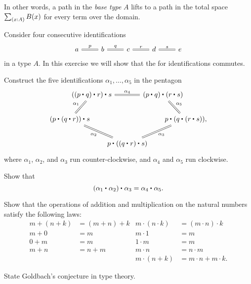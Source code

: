 \begin{exercises}
\begin{equation*}
\end{equation*}
In other words, a path in the \emph{base type} $A$ lifts to a path in the total space $\sm{x:A}B(x)$ for every term over the domain.
\item Consider four consecutive identifications
\begin{equation*}
\begin{tikzcd}
a \arrow[r,equals,"p"] & b \arrow[r,equals,"q"] & c \arrow[r,equals,"r"] & d \arrow[r,equals,"s"] & e
\end{tikzcd}
\end{equation*}
in a type $A$. In this exercise we will show that the  for identifications commutes.
\begin{subexenum}
\item Construct the five identifications $\alpha_1,\ldots,\alpha_5$ in the pentagon
\begin{equation*}
\begin{tikzcd}[column sep=-1.5em]
&[-2em] \ct{(\ct{(\ct{p}{q})}{r})}{s} \arrow[rr,equals,"\alpha_4"] \arrow[dl,equals,swap,"\alpha_1"] & & \ct{(\ct{p}{q})}{(\ct{r}{s})} \arrow[dr,equals,"\alpha_5"] &[-2em] \\
\ct{(\ct{p}{(\ct{q}{r})})}{s} \arrow[drr,equals,swap,"\alpha_2"] & & & & \ct{p}{(\ct{q}{(\ct{r}{s})})}, \\
& & \ct{p}{(\ct{(\ct{q}{r})}{s})} \arrow[urr,equals,swap,"\alpha_3"]
\end{tikzcd}
\end{equation*}
where $\alpha_1$, $\alpha_2$, and $\alpha_3$ run counter-clockwise, and $\alpha_4$ and $\alpha_5$ run clockwise.
\item Show that
\begin{equation*}
\ct{(\ct{\alpha_1}{\alpha_2})}{\alpha_3} = \ct{\alpha_4}{\alpha_5}.
\end{equation*}
\end{subexenum}
\item Show that the operations of addition and multiplication on the natural numbers satisfy the following laws:
\begin{align*}
m+(n+k) & =(m+n)+k & m\cdot (n\cdot k) & = (m\cdot n)\cdot k \\
m+0 & = m & m\cdot 1 & = m \\
0+m & = m & 1\cdot m & = m \\
m+n & = n+m & m\cdot n & = n\cdot m\\
& & m\cdot (n+k) & = m\cdot n + m\cdot k.
\end{align*}
\item State Goldbach's conjecture in type theory.
\end{exercises}
